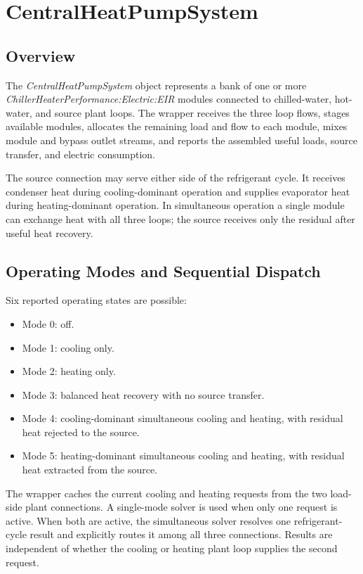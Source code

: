 \section{CentralHeatPumpSystem }
\label{centralheatpumpsystem}

\subsection{Overview}
\label{overview-007}

The \emph{CentralHeatPumpSystem} object represents a bank of one or more \emph{ChillerHeaterPerformance:Electric:EIR} modules connected to chilled-water, hot-water, and source plant loops. The wrapper receives the three loop flows, stages available modules, allocates the remaining load and flow to each module, mixes module and bypass outlet streams, and reports the assembled useful loads, source transfer, and electric consumption.

The source connection may serve either side of the refrigerant cycle. It receives condenser heat during cooling-dominant operation and supplies evaporator heat during heating-dominant operation. In simultaneous operation a single module can exchange heat with all three loops; the source receives only the residual after useful heat recovery.

\subsection{Operating Modes and Sequential Dispatch}
\label{operating-modes-and-sequential-dispatch}

Six reported operating states are possible:

\begin{itemize}
\item Mode 0: off.
\item Mode 1: cooling only.
\item Mode 2: heating only.
\item Mode 3: balanced heat recovery with no source transfer.
\item Mode 4: cooling-dominant simultaneous cooling and heating, with residual heat rejected to the source.
\item Mode 5: heating-dominant simultaneous cooling and heating, with residual heat extracted from the source.
\end{itemize}

The wrapper caches the current cooling and heating requests from the two load-side plant connections. A single-mode solver is used when only one request is active. When both are active, the simultaneous solver resolves one refrigerant-cycle result and explicitly routes it among all three connections. Results are independent of whether the cooling or heating plant loop supplies the second request.

